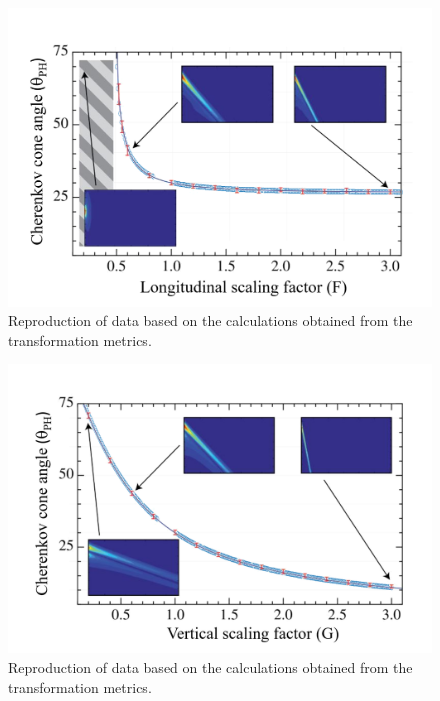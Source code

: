 \begin{figure}
    \centering
    \includegraphics[width=0.8\columnwidth]{SBU_plots/phiVsFoverlayed.png}
    \caption{Reproduction of data based on the calculations obtained from the transformation metrics.}
    \label{fig:phiVsF}
\end{figure}
\begin{figure}
    \centering
    \includegraphics[width=0.8\columnwidth]{SBU_plots/phiVsGoverlayed.png}
    \caption{Reproduction of data based on the calculations obtained from the transformation metrics.}
    \label{fig:phiVsG}
\end{figure}